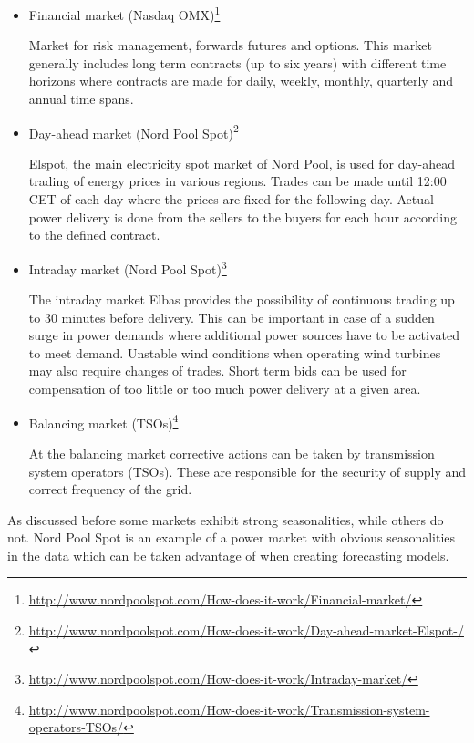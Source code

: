 \begin{itemize}[-]

\item Financial market (Nasdaq OMX)\footnote{\url{http://www.nordpoolspot.com/How-does-it-work/Financial-market/}}

Market for risk management, forwards futures and options. 
This market generally includes long term contracts (up to six
years) with different time horizons where contracts are made for 
daily, weekly, monthly, quarterly and annual time spans. 

\item Day-ahead market (Nord Pool Spot)\footnote{\url{http://www.nordpoolspot.com/How-does-it-work/Day-ahead-market-Elspot-/}}

Elspot, the main electricity spot market of Nord Pool, is used for day-ahead
trading of energy prices in various regions. 
Trades can be made until 12:00 CET of each day where the prices
are fixed for the following day. Actual power delivery is done
from the sellers to the buyers for each hour according to the defined contract. 

\item Intraday market (Nord Pool Spot)\footnote{\url{http://www.nordpoolspot.com/How-does-it-work/Intraday-market/}}

The intraday market Elbas provides the possibility of continuous trading up to 30 minutes before delivery. 
This can be important in case of a sudden surge in power demands where additional power sources have to be
activated to meet demand. Unstable wind conditions when operating wind turbines may also require changes of trades. 
Short term bids can be used for compensation of too little or too much power delivery at a given area. 

\item Balancing market (TSOs)\footnote{\url{http://www.nordpoolspot.com/How-does-it-work/Transmission-system-operators-TSOs/}}

At the balancing market corrective actions can be taken by transmission system operators (TSOs). 
These are responsible for the security of supply and correct frequency of the grid. 

\end{itemize}



As discussed before some markets exhibit strong seasonalities, while others do not. Nord Pool Spot is an example of a power market with obvious seasonalities in the data which can be taken advantage of when creating forecasting models. 

